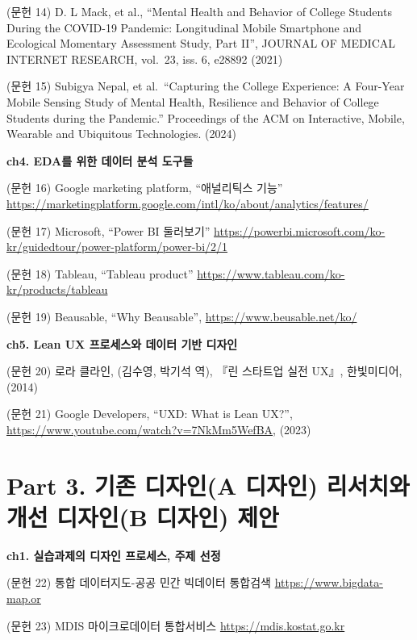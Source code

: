 \documentclass[
  letterpaper,
]{book}
\begin{document}
(문헌 14) D. L Mack, et al., ``Mental Health and Behavior of College
Students During the COVID-19 Pandemic: Longitudinal Mobile Smartphone
and Ecological Momentary Assessment Study, Part II'', JOURNAL OF MEDICAL
INTERNET RESEARCH, vol.~23, iss. 6, e28892 (2021)

(문헌 15) Subigya Nepal, et al.~``Capturing the College Experience: A
Four-Year Mobile Sensing Study of Mental Health, Resilience and Behavior
of College Students during the Pandemic.'' Proceedings of the ACM on
Interactive, Mobile, Wearable and Ubiquitous Technologies. (2024)

\textbf{ch4. EDA를 위한 데이터 분석 도구들}

(문헌 16) Google marketing platform, ``애널리틱스 기능''
\url{https://marketingplatform.google.com/intl/ko/about/analytics/features/}

(문헌 17) Microsoft, ``Power BI 둘러보기''
\url{https://powerbi.microsoft.com/ko-kr/guidedtour/power-platform/power-bi/2/1}

(문헌 18) Tableau, ``Tableau product''
\url{https://www.tableau.com/ko-kr/products/tableau}

(문헌 19) Beausable, ``Why Beausable'',
\url{https://www.beusable.net/ko/}

\textbf{ch5. Lean UX 프로세스와 데이터 기반 디자인}

(문헌 20) 로라 클라인, (김수영, 박기석 역), 『린 스타트업 실전 UX』,
한빛미디어,(2014)

(문헌 21) Google Developers, ``UXD: What is Lean UX?'',
\url{https://www.youtube.com/watch?v=7NkMm5WefBA}, (2023)

\section*{Part 3. 기존 디자인(A 디자인) 리서치와 개선 디자인(B 디자인)
제안}\label{part-3.-uxae30uxc874-uxb514uxc790uxc778a-uxb514uxc790uxc778-uxb9acuxc11cuxce58uxc640-uxac1cuxc120-uxb514uxc790uxc778b-uxb514uxc790uxc778-uxc81cuxc548-1}


\textbf{ch1. 실습과제의 디자인 프로세스, 주제 선정}

(문헌 22) 통합 데이터지도-공공 민간 빅데이터 통합검색
\url{https://www.bigdata-map.or}

(문헌 23) MDIS 마이크로데이터 통합서비스 \url{https://mdis.kostat.go.kr}
\end{document}
